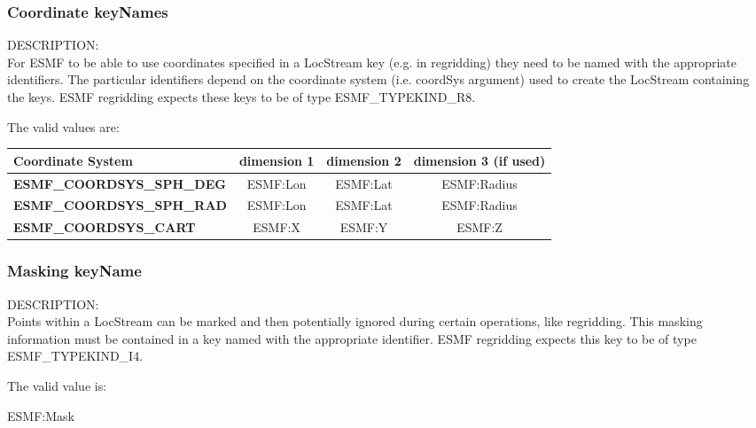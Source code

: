 

\subsubsection{Coordinate keyNames}
\label{const:coordkeyname}

{\sf DESCRIPTION:\\}
For ESMF to be able to use coordinates specified in a LocStream key (e.g. in regridding) 
they need to be named with the appropriate identifiers. The particular identifiers depend 
on the coordinate system (i.e. coordSys argument) used to create the LocStream containing 
the keys.  ESMF regridding expects these keys to be of type ESMF_TYPEKIND_R8. 

The valid values are:
\newline
\begin{tabular}{|l|c|c|c||}
\hline
\hline
Coordinate System & {\bf dimension 1}  & {\bf dimension 2} & {\bf dimension 3 (if used)} \\
\hline
{\bf ESMF\_COORDSYS\_SPH\_DEG}  & ESMF:Lon & ESMF:Lat & ESMF:Radius \\
{\bf ESMF\_COORDSYS\_SPH\_RAD}  & ESMF:Lon & ESMF:Lat & ESMF:Radius \\
{\bf ESMF\_COORDSYS\_CART}  & ESMF:X & ESMF:Y & ESMF:Z \\
\hline
\hline
\end{tabular}


\subsubsection{Masking keyName}
\label{const:maskkeyname}

{\sf DESCRIPTION:\\}
Points within a LocStream can be marked and then potentially ignored during certain 
operations, like regridding.  This masking information must be contained in a key 
named with the appropriate identifier.  ESMF regridding expects this key to be 
of type ESMF_TYPEKIND_I4.

The valid value is:
\begin{description}
\item [ESMF:Mask] 
\end{description}
